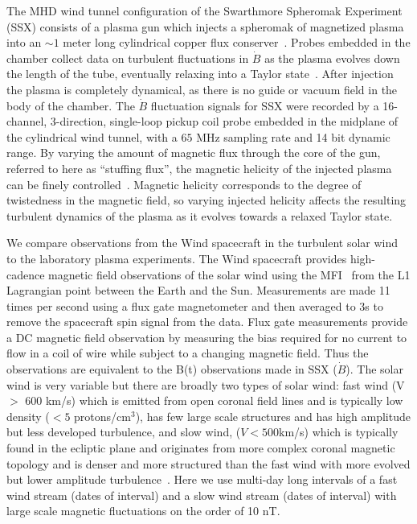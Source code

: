 \documentclass[aps,pre,twocolumn,secnumarabic,nobalancelastpage,amsmath,amssymb,
nofootinbib]{revtex4-1}
\begin{document}
The MHD wind tunnel configuration of the Swarthmore Spheromak Experiment (SSX) consists of a plasma gun which injects a spheromak of magnetized plasma into an $\sim1$ meter long cylindrical copper flux conserver~\cite{gray2013}. Probes embedded in the chamber collect data on turbulent fluctuations in $\dot{B}$ as the plasma evolves down the length of the tube, eventually relaxing into a Taylor state~\cite{gray2013,schaffner2014a,schaffner2014b,schaffner2014c}. After injection the plasma is completely dynamical, as there is no guide or vacuum field in the body of the chamber. The $\dot{B}$ fluctuation signals for SSX  were recorded by a 16-channel, 3-direction, single-loop pickup coil probe embedded in the midplane of the cylindrical wind tunnel, with a $65$ MHz sampling rate and 14 bit dynamic range. By varying the amount of magnetic flux through the core of the gun, referred to here as ``stuffing flux'', the magnetic helicity of the injected plasma can be finely controlled~\cite{schaffner2014b}. Magnetic helicity corresponds to the degree of twistedness in the magnetic field, so varying injected helicity affects the resulting turbulent dynamics of the plasma as it evolves towards a relaxed Taylor state. 

We compare observations from the Wind spacecraft in the turbulent solar wind to the laboratory plasma experiments. The Wind spacecraft provides high-cadence magnetic field observations of the solar wind using the MFI~\cite{lepping1995} from the L1 Lagrangian point between the Earth and the Sun. Measurements are made 11 times per second using a flux gate magnetometer and then averaged to 3s to remove the spacecraft spin signal from the data. Flux gate measurements provide a DC magnetic field observation by measuring the bias required for no current to flow in a coil of wire while subject to a changing magnetic field. Thus the observations are equivalent to the B(t) observations made in SSX ($\dot{B}$). The solar wind is very variable but there are broadly two types of solar wind: fast wind (V $>$ 600 km/s) which is emitted from open coronal field lines and is typically low density ($< 5$ protons/cm$^3$), has few large scale structures and has high amplitude but less developed turbulence, and slow wind, ($V < 500 $km/s) which is typically found in the ecliptic plane and originates from more complex coronal magnetic topology and is denser and more structured than the fast wind with more evolved but lower amplitude turbulence~\cite{tu1990,bruno2013}. Here we use multi-day long intervals of a fast wind stream (dates of interval) and a slow wind stream (dates of interval) with large scale magnetic fluctuations on the order of 10 nT. 
\end{document}
